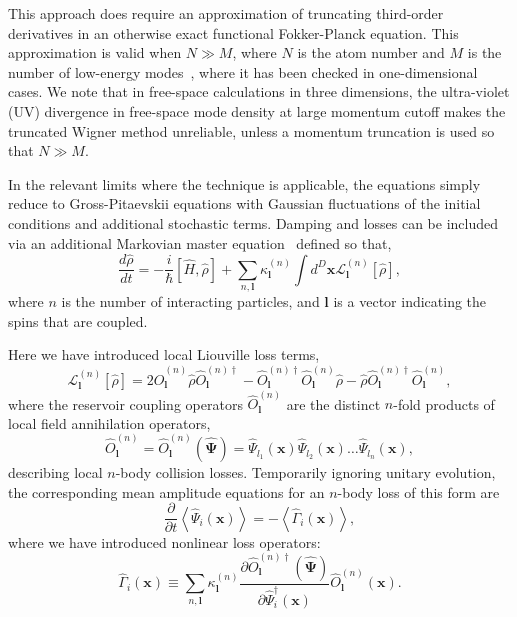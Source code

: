 \documentclass[aps,prl,twocolumn,showpacs,amsmath,amssymb,superscriptaddress]{revtex4-1}
\newcommand{\xvec}{\boldsymbol{x}}
\newcommand{\lvec}{\boldsymbol{l}}
\newcommand{\Psivec}{\boldsymbol{\Psi}}
\begin{document}
This approach does require an approximation of truncating third-order derivatives
in an otherwise exact functional Fokker-Planck equation.
This approximation is valid when $N \gg M$, where $N$ is the atom number and
$M$ is the number of low-energy modes~\cite{Drummond1993,Sinatra2002,Norrie2006},
where it has been checked in one-dimensional cases.
We note that in free-space calculations in three dimensions,
the ultra-violet (UV) divergence in free-space mode density at large momentum cutoff
makes the truncated Wigner method unreliable,
unless a momentum truncation is used so that $N \gg M$.

In the relevant limits where the technique is applicable,
the equations simply reduce to Gross-Pitaevskii equations with Gaussian fluctuations
of the initial conditions and additional stochastic terms.
Damping and losses can be included via an additional Markovian master equation~\cite{Jack2002}
defined so that,
\begin{equation}
	\frac{d\hat{\rho}}{dt} = -\frac{i}{\hbar} \left[ \hat{H}, \hat{\rho} \right] +
	\sum_{n,\lvec} \kappa_{\lvec}^{(n)}
	\int d^D\xvec \mathcal{L}_{\lvec}^{(n)} \left[ \hat{\rho} \right],
\end{equation}
where $n$ is the number of interacting particles,
and $\lvec$ is a vector indicating the spins that are coupled.

Here we have introduced local Liouville loss terms,
\begin{equation}
	\mathcal{L}_{\lvec}^{(n)} \left[ \hat{\rho}\right] =
	2 \hat{O}_{\lvec}^{(n)} \hat{\rho}\hat{O}_{\lvec}^{(n)\dagger} -
	\hat{O}_{\lvec}^{(n)\dagger}\hat{O}_{\lvec}^{(n)}\hat{\rho} -
	\hat{\rho}\hat{O}_{\lvec}^{(n)\dagger}\hat{O}_{\lvec}^{(n)},
\end{equation}
where the reservoir coupling operators $\hat{O}_{\lvec}^{(n)}$
are the distinct $n$-fold products of local field annihilation operators,
\begin{equation}
	\hat{O}_{\lvec}^{(n)} =
	\hat{O}_{\lvec}^{(n)} \left( \widehat{\Psivec} \right) =
	\widehat{\Psi}_{l_{1}} \left( \xvec \right)
	\widehat{\Psi}_{l_{2}} \left( \xvec \right) \ldots
	\widehat{\Psi}_{l_{n}} \left( \xvec \right),
\end{equation}
describing local $n$-body collision losses.
Temporarily ignoring unitary evolution, the corresponding mean amplitude equations
for an $n$-body loss of this form are
\begin{equation}
	\frac{\partial}{\partial t} \left\langle
		\widehat{\Psi}_{i} \left( \xvec \right)
	\right\rangle =
	-\left\langle \hat{\Gamma}_{i} \left( \xvec \right) \right\rangle ,
\end{equation}
where we have introduced  nonlinear loss operators:
\begin{equation}
	\hat{\Gamma}_{i} \left( \xvec \right) \equiv
	\sum_{n,\lvec} \kappa_{\lvec}^{(n)}
	\frac{\partial\hat{O}_{\lvec}^{(n)\dagger}	\left( \widehat{\Psivec} \right)}
		{\partial \hat{\Psi}_{i}^{\dagger} \left( \xvec \right)}
	\hat{O}_{\lvec}^{(n)} \left( \xvec \right) .
\end{equation}
\end{document}
